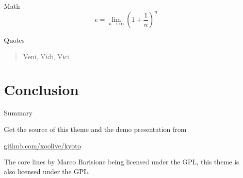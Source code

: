 \documentclass[10pt, compress]{beamer}
\begin{document}
\begin{frame}{Math}
  \begin{equation*}
    e = \lim_{n\to \infty} \left(1 + \frac{1}{n}\right)^n
  \end{equation*}
\end{frame}
\begin{frame}{Quotes}
  \begin{quote}
    Veni, Vidi, Vici
  \end{quote}
\end{frame}


\section{Conclusion}

\begin{frame}{Summary}

  Get the source of this theme and the demo presentation from

  \begin{center}\url{github.com/xoolive/kyoto}\end{center}

  The core lines by Marco Barisione being licensed under the GPL, this theme is
  also licensed under the GPL.

\end{frame}
\end{document}
